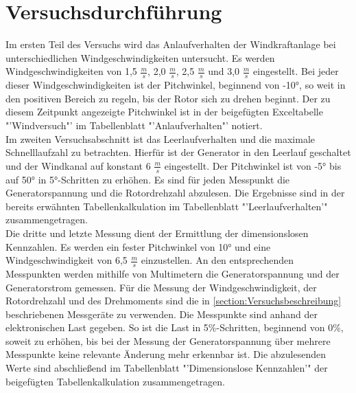 \section{Versuchsdurchführung}
\label{section:Versuchsdurchführung}
Im ersten Teil des Versuchs wird das Anlaufverhalten der Windkraftanlage bei unterschiedlichen Windgeschwindigkeiten untersucht.
Es werden Windgeschwindigkeiten von 1,5 $\frac{m}{s}$, 2,0 $\frac{m}{s}$, 2,5 $\frac{m}{s}$ und 3,0 $\frac{m}{s}$ eingestellt.
Bei jeder dieser Windgeschwindigkeiten ist der Pitchwinkel, beginnend von -10°, so weit in den positiven Bereich zu regeln, bis der Rotor sich zu drehen beginnt. Der zu diesem Zeitpunkt angezeigte Pitchwinkel ist in der beigefügten Exceltabelle "'Windversuch"' im Tabellenblatt "'Anlaufverhalten"' notiert.\\
Im zweiten Versuchsabschnitt ist das Leerlaufverhalten und die maximale Schnelllaufzahl zu betrachten.
Hierfür ist der Generator in den Leerlauf geschaltet und der Windkanal auf konstant 6 $\frac{m}{s}$ eingestellt.
Der Pitchwinkel ist von -5° bis auf 50° in 5°-Schritten zu erhöhen.
Es sind für jeden Messpunkt die Generatorspannung und die Rotordrehzahl abzulesen.
Die Ergebnisse sind in der bereits erwähnten Tabellenkalkulation im Tabellenblatt "'Leerlaufverhalten'" zusammengetragen.\\
Die dritte und letzte Messung dient der Ermittlung der dimensionslosen Kennzahlen.
Es werden ein fester Pitchwinkel von 10° und eine Windgeschwindigkeit von 6,5 $\frac{m}{s}$ einzustellen.
An den entsprechenden Messpunkten werden mithilfe von  Multimetern die Generatorspannung und der Generatorstrom gemessen.
Für die Messung der Windgeschwindigkeit, der Rotordrehzahl und des Drehmoments sind die in \autoref{section:Versuchsbeschreibung} beschriebenen Messgeräte zu verwenden.
Die Messpunkte sind anhand der elektronischen Last gegeben. So ist die Last in 5\%-Schritten, beginnend von 0\%, soweit zu erhöhen, bis bei der Messung der Generatorspannung über mehrere Messpunkte keine relevante Änderung mehr erkennbar ist.
Die abzulesenden Werte sind abschließend im Tabellenblatt "'Dimensionslose Kennzahlen'" der beigefügten Tabellenkalkulation zusammengetragen.